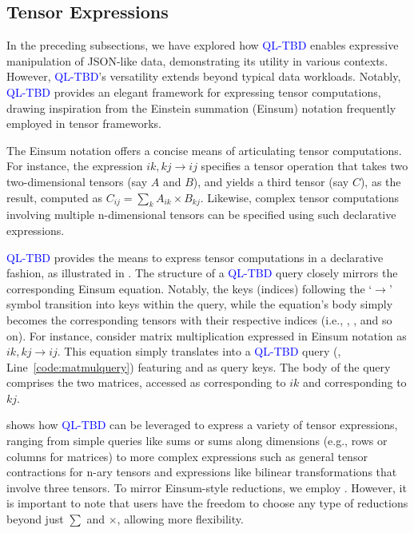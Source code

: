 \documentclass[runningheads]{llncs}
\newcommand{\lang}{\textcolor{blue}{QL-TBD}}
\begin{document}
\subsection{Tensor Expressions}\label{subsec:tensor}
In the preceding subsections, we have explored how \lang{} enables expressive
manipulation of JSON-like data, demonstrating its utility in various contexts.
However, \lang{}'s versatility extends beyond typical data workloads.
Notably, \lang{} provides an elegant framework for expressing tensor computations,
drawing inspiration from the Einstein summation (Einsum) notation frequently
employed in tensor frameworks.

The Einsum notation offers a concise means of articulating tensor computations.
For instance, the expression $ik,kj \rightarrow ij$ specifies a tensor operation
that takes two two-dimensional tensors (say $A$ and $B$), and yields a third
tensor (say $C$), as the result, computed as $C_{ij} = \sum_k A_{ik} \times B_{kj}$.
Likewise, complex tensor computations involving multiple n-dimensional tensors can
be specified using such declarative expressions.

\lang{} provides the means to express tensor computations in a declarative fashion,
as illustrated in .
The structure of a \lang{} query closely mirrors the corresponding Einsum equation.
Notably, the keys (indices) following the `$\rightarrow$' symbol transition into keys
within the query, while the equation's body simply becomes the corresponding tensors
with their respective indices (i.e., , , and so on).
For instance, consider matrix multiplication expressed in Einsum notation as
$ik,kj \rightarrow ij$.
This equation simply translates into a \lang{} query (, Line~\ref{code:matmulquery}) featuring  and
 as query keys. The body of the query comprises the two matrices, accessed as
 corresponding to $ik$ and  corresponding to $kj$.

 shows how \lang{} can be leveraged to express a variety of
tensor expressions, ranging from simple queries like sums or sums along
dimensions (e.g., rows or columns for matrices) to more complex expressions
such as general tensor contractions for n-ary tensors and expressions like
bilinear transformations that involve three tensors. 
To mirror Einsum-style reductions, we employ .
However, it is important to note that users have the freedom to choose
any type of reductions beyond just $\sum$ and $\times$, allowing more flexibility.
\end{document}
